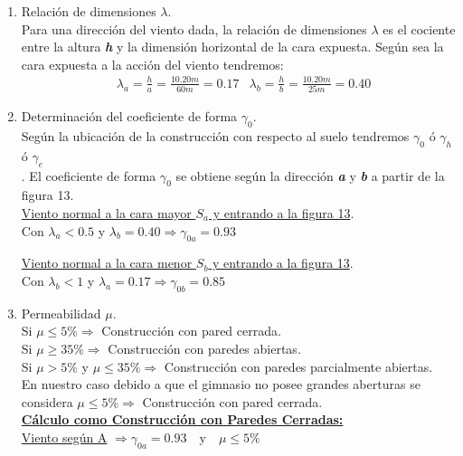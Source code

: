 \begin{enumerate}
\begin{itemize}
\end{itemize}

\item Relación de dimensiones $\lambda$.\\
Para una dirección del viento dada, la relación de dimensiones $\lambda$ es el cociente entre la altura \emph{\textbf{h}} y la dimensión horizontal de la cara expuesta. Según sea la cara expuesta a la acción del viento tendremos:\\

\begin{align*}
& \lambda_a = \frac{h}{a} = \frac{10.20m}{60m} = 0.17
& \lambda_b = \frac{h}{b} = \frac{10.20m}{25m} = 0.40
\end{align*}

\item Determinación del coeficiente de forma $\gamma_0$.\\
Según la ubicación de la construcción con respecto al suelo tendremos $\gamma_0$ ó $\gamma_h$ ó $\gamma_e$\\.
El coeficiente de forma $\gamma_0$ se obtiene según la dirección \emph{\textbf{a}} y \emph{\textbf{b}} a partir de la figura 13.\\

\underline{Viento normal a la cara mayor $S_a$ y entrando a la figura 13}.\\

Con $ \lambda_a < 0.5 $ y $ \lambda_b = 0.40 \Rightarrow \gamma_{0a} = 0.93$

\underline{Viento normal a la cara menor $S_b$ y entrando a la figura 13}.\\

Con $ \lambda_b < 1 $ y $ \lambda_a = 0.17 \Rightarrow \gamma_{0b} = 0.85$

\newpage
\item Permeabilidad $\mu$. \\
Si $\mu \leq 5\% \Rightarrow $ Construcción con pared cerrada.\\
Si $\mu \geq 35\% \Rightarrow $ Construcción con paredes abiertas.\\
Si $\mu > 5\%$ y $\mu \leq 35\% \Rightarrow $ Construcción con paredes parcialmente abiertas.\\
En nuestro caso debido a que el gimnasio no posee grandes aberturas se considera $\mu \leq 5\% \Rightarrow $ Construcción con pared cerrada.\\

\textbf{\underline{Cálculo como Construcción con Paredes Cerradas:}}\\
\newline
\underline{Viento según A} $\Rightarrow \gamma_{0a}=0.93 \quad \text{y} \quad \mu \leq 5\%$\\


\end{enumerate}
